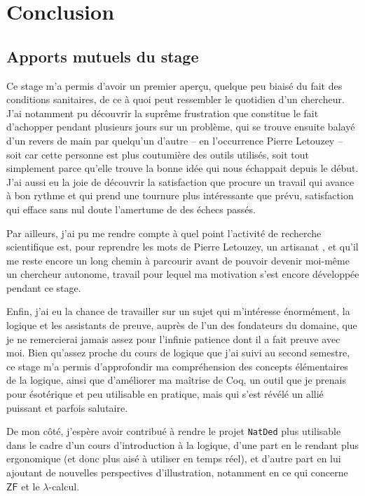 \documentclass[a4paper]{article}
\newcommand{\ZF}{\mathsf{ZF}}
\theoremstyle{remark}
\theoremstyle{remark}
\theoremstyle{remark}
\theoremstyle{definition}
\theoremstyle{definition}
\theoremstyle{definition}
\begin{document}

\section*{Conclusion}

\subsection*{Apports mutuels du stage}

Ce stage m'a permis d'avoir un premier aperçu, quelque peu biaisé du fait des conditions sanitaires, de ce à quoi peut ressembler le quotidien d'un chercheur. J'ai notamment pu découvrir la suprême frustration que constitue le fait d'achopper pendant plusieurs jours sur un problème, qui se trouve ensuite balayé d'un revers de main par quelqu'un d'autre -- en l'occurrence Pierre Letouzey -- soit car cette personne est plus coutumière des outils utilisés, soit tout simplement parce qu'elle trouve la bonne idée qui nous échappait depuis le début. J'ai aussi eu la joie de découvrir la satisfaction que procure un travail qui avance à bon rythme et qui prend une tournure plus intéressante que prévu, satisfaction qui efface sans nul doute l'amertume de des échecs passés.

Par ailleurs, j'ai pu me rendre compte à quel point l'activité de recherche scientifique est, pour reprendre les mots de Pierre Letouzey, un \og artisanat \fg{}, et qu'il me reste encore un long chemin à parcourir avant de pouvoir devenir moi-même un chercheur autonome, travail pour lequel ma motivation s'est encore développée pendant ce stage.

Enfin, j'ai eu la chance de travailler sur un sujet qui m'intéresse énormément, la logique et les assistants de preuve, auprès de l'un des fondateurs du domaine, que je ne remercierai jamais assez pour l'infinie patience dont il a fait preuve avec moi. Bien qu'assez proche du cours de logique que j'ai suivi au second semestre, ce stage m'a permis d'approfondir ma compréhension des concepts élémentaires de la logique, ainsi que d'améliorer ma maîtrise de Coq, un outil que je prenais pour ésotérique et peu utilisable en pratique, mais qui s'est révélé un allié puissant et parfois salutaire.
\medskip

De mon côté, j'espère avoir contribué à rendre le projet \verb+NatDed+ plus utilisable dans le cadre d'un cours d'introduction à la logique, d'une part en le rendant plus ergonomique (et donc plus aisé à utiliser en temps réel), et d'autre part en lui ajoutant de nouvelles perspectives d'illustration, notamment en ce qui concerne $\ZF$ et le $\lambda$-calcul.
\end{document}
